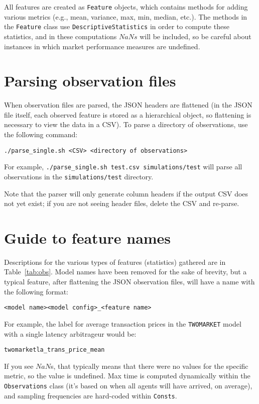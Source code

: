\documentclass[11pt]{article}
\begin{document}
All features are created as \verb|Feature| objects, which contains methods for adding various metrics (e.g., mean, variance, max, min, median, etc.).
The methods in the \verb|Feature| class use \verb|DescriptiveStatistics| in order to compute these statistics, and in these computations $NaNs$ will be included, so be careful about instances in which market performance measures are undefined.


\section{Parsing observation files}

When observation files are parsed, the JSON headers are flattened (in the JSON file itself, each observed feature is stored as a hierarchical object, so flattening is necessary to view the data in a CSV).
%
To parse a directory of observations, use the following command:
\begin{verbatim}
./parse_single.sh <CSV> <directory of observations>
\end{verbatim}
For example, \verb|./parse_single.sh test.csv simulations/test| will parse all observations in the \verb|simulations/test| directory.

Note that the parser will only generate column headers if the output CSV does not yet exist; if you are not seeing header files, delete the CSV and re-parse.

\section{Guide to feature names}

Descriptions for the various types of features (statistics) gathered are in Table~\ref{tab:obs}.
Model names have been removed for the sake of brevity, but a typical feature, after flattening the JSON observation files, will have a name with the following format: \begin{verbatim}<model name><model config>_<feature name>\end{verbatim}
%
For example, the label for average transaction prices in the \verb|TWOMARKET| model with a single latency arbitrageur would be:
\begin{verbatim}twomarketla_trans_price_mean\end{verbatim}

If you see $NaN$s, that typically means that there were no values for the specific metric, so the value is undefined. Max time is computed dynamically within the \verb|Observations| class (it's based on when all agents will have arrived, on average), and sampling frequencies are hard-coded within \verb|Consts|.
\end{document}
